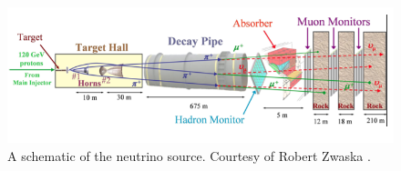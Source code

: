 \begin{figure}[t]
  \begin{center}
    \includegraphics[width=\textwidth]{figures/figures/numi.png}
  \end{center}
  \caption[A schematic of the \numi neutrino source.]{A schematic of the \numi neutrino source.  Courtesy of Robert Zwaska \cite{zwaska2005thesis}.}
  \label{numi}
\end{figure}

